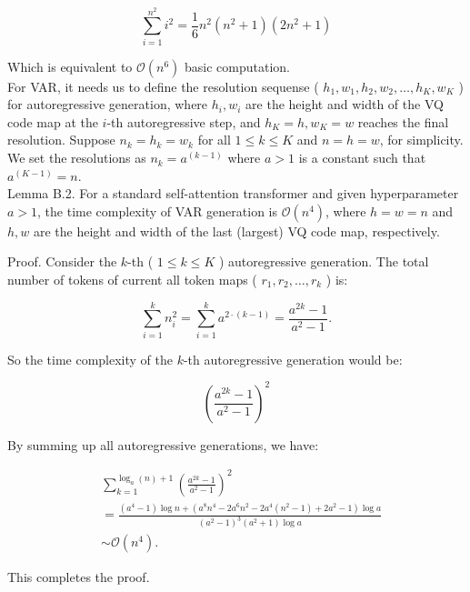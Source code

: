 \documentclass{article}
\begin{document}
$$
\sum_{i=1}^{n^{2}} i^{2}=\frac{1}{6} n^{2}\left(n^{2}+1\right)\left(2 n^{2}+1\right)
$$

Which is equivalent to $\mathcal{O}\left(n^{6}\right)$ basic computation.\\
For VAR, it needs us to define the resolution sequense ( $h_{1}, w_{1}, h_{2}, w_{2}, \ldots, h_{K}, w_{K}$ ) for autoregressive generation, where $h_{i}, w_{i}$ are the height and width of the VQ code map at the $i$-th autoregressive step, and $h_{K}=h, w_{K}=w$ reaches the final resolution. Suppose $n_{k}=h_{k}=w_{k}$ for all $1 \leq k \leq K$ and $n=h=w$, for simplicity. We set the resolutions as $n_{k}=a^{(k-1)}$ where $a>1$ is a constant such that $a^{(K-1)}=n$.\\
Lemma B.2. For a standard self-attention transformer and given hyperparameter $a>1$, the time complexity of VAR generation is $\mathcal{O}\left(n^{4}\right)$, where $h=w=n$ and $h, w$ are the height and width of the last (largest) VQ code map, respectively.

Proof. Consider the $k$-th ( $1 \leq k \leq K$ ) autoregressive generation. The total number of tokens of current all token maps ( $r_{1}, r_{2}, \ldots, r_{k}$ ) is:

$$
\sum_{i=1}^{k} n_{i}^{2}=\sum_{i=1}^{k} a^{2 \cdot(k-1)}=\frac{a^{2 k}-1}{a^{2}-1} .
$$

So the time complexity of the $k$-th autoregressive generation would be:

$$
\left(\frac{a^{2 k}-1}{a^{2}-1}\right)^{2}
$$

By summing up all autoregressive generations, we have:

$$
\begin{aligned}
& \sum_{k=1}^{\log _{a}(n)+1}\left(\frac{a^{2 k}-1}{a^{2}-1}\right)^{2} \\
& =\frac{\left(a^{4}-1\right) \log n+\left(a^{8} n^{4}-2 a^{6} n^{2}-2 a^{4}\left(n^{2}-1\right)+2 a^{2}-1\right) \log a}{\left(a^{2}-1\right)^{3}\left(a^{2}+1\right) \log a} \\
& \sim \mathcal{O}\left(n^{4}\right) .
\end{aligned}
$$

This completes the proof.
\end{document}
